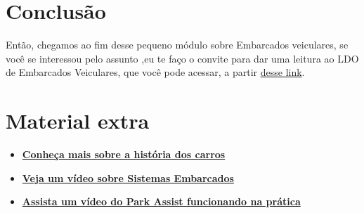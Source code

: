 \documentclass[12pt]{article}
\begin{document}
    \newpage 
    
    \section{Conclusão}

    Então, chegamos ao fim desse pequeno módulo sobre Embarcados veiculares, se você se interessou pelo assunto
    ,eu te faço o convite para dar uma leitura ao LDO de Embarcados Veiculares, que você
    pode acessar, a partir \href{https://solid-titans.github.io/LDO-Embarcados-Veiculares/}{desse link}.

    \newpage
    \section*{\centering Material extra}\label{sec:extra} %

    \begin{itemize}
        
        \item \href{https://www.youtube.com/watch?v=sZVfhWCfz2g}{\textbf{Conheça mais sobre a história dos carros}}
        
        \item \href{https://www.youtube.com/watch?v=XppU8kKpa6I}{\textbf{Veja um vídeo sobre Sistemas Embarcados}}
    
        \item \href{https://www.youtube.com/watch?v=oVBvOwyCFmg}{\textbf{Assista um vídeo do Park Assist funcionando na prática}}

    \end{itemize}

    \newpage
\end{document}
